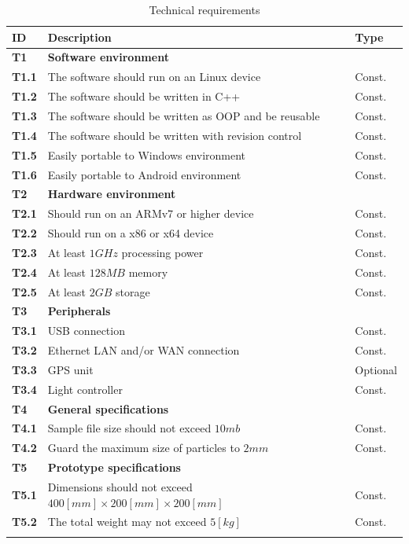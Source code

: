 \documentclass[11pt,fleqn,,a4paper,twoside,openright]{book}
\begin{document}
\begin{longtable}{|p{1cm}| p{10cm} p{1.5cm}|}
\hline 
\textbf{ID} & \textbf{Description} & \textbf{Type} \\ 
\endhead
\hline 
\textbf{T1}\label{T1} & \textbf{Software environment} &  \\ 
\hline 
\textbf{T1.1}\label{T1.1} & The software should run on an Linux device & Const. \\ 
\hline 
\textbf{T1.2}\label{T1.2} & The software should be written in C++ & Const. \\ 
\hline 
\textbf{T1.3}\label{T1.3} & The software should be written as OOP and be reusable & Const. \\ 
\hline 
\textbf{T1.4}\label{T1.4} & The software should be written with revision control & Const. \\
\hline 
\textbf{T1.5}\label{T1.5} & Easily portable to Windows environment & Const. \\
\hline 
\textbf{T1.6}\label{T1.6} & Easily portable to Android environment & Const. \\
\hline 
\textbf{T2}\label{T2} & \textbf{Hardware environment} &  \\ 
\hline 
\textbf{T2.1}\label{T2.1} & Should run on an ARMv7 or higher device &  Const. \\ 
\hline 
\textbf{T2.2}\label{T2.2} & Should run on a x86 or x64 device & Const. \\
\hline 
\textbf{T2.3}\label{T2.3} & At least $1 GHz$ processing power & Const. \\
\hline 
\textbf{T2.4}\label{T2.4} & At least $128 MB$ memory & Const. \\
\hline 
\textbf{T2.5}\label{T2.5} & At least $2 GB$ storage & Const. \\
\hline 
\textbf{T3}\label{T3} & \textbf{Peripherals}  &  \\ 
\hline 
\textbf{T3.1}\label{T3.1} & USB connection  & Const. \\ 
\hline 
\textbf{T3.2}\label{T3.2} & Ethernet LAN and/or WAN connection  & Const. \\ 
\hline 
\textbf{T3.3}\label{T3.3} & GPS unit & Optional  \\ 
\hline 
\textbf{T3.4}\label{T3.4} & Light controller & Const. \\
\hline 
\textbf{T4}\label{T4} & \textbf{General specifications} &  \\ 
\hline 
\textbf{T4.1}\label{T4.1} & Sample file size should not exceed $ 10 mb $ & Const. \\
\hline 
\textbf{T4.2}\label{T4.2} & Guard the maximum size of particles to $ 2 mm $ & Const. \\
\hline 
\textbf{T5}\label{T5} & \textbf{Prototype specifications} &  \\ 
\hline 
\textbf{T5.1}\label{T5.1} & Dimensions should not exceed $ 400[mm] \times 200[mm] \times 200[mm] $ & Const. \\
\hline 
\textbf{T5.2}\label{T5.2} & The total weight may not exceed $ 5[kg] $ & Const. \\
\hline 
\caption{Technical requirements}\label{tab:TechReq}	
\end{longtable} 
\end{document}
